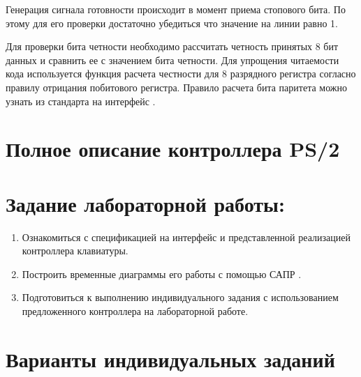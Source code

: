 \par{Генерация сигнала готовности происходит в момент приема стопового бита. По этому для его проверки достаточно убедиться что значение на линии  равно 1.}

\par{Для проверки бита четности необходимо рассчитать четность принятых 8 бит данных и сравнить ее с значением бита четности. Для упрощения читаемости кода используется функция расчета честности для 8 разрядного регистра согласно правилу отрицания побитового  регистра. Правило расчета бита паритета можно узнать из стандарта на интерфейс .}




\section{Полное описание контроллера PS/2}






\section{Задание лабораторной работы:}
\begin{enumerate}[noitemsep,topsep=0pt, after=\vspace{2pt}]

\item{Ознакомиться с спецификацией на интерфейс  и представленной реализацией контроллера клавиатуры.}

\item{Построить временные диаграммы его работы с помощью САПР .}

\item{Подготовиться к выполнению индивидуального задания с использованием предложенного контроллера на лабораторной работе.}

\end{enumerate}





\section{Варианты индивидуальных заданий}


